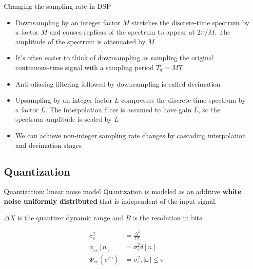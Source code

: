 \documentclass[10pt, aspectratio=169]{beamer}
\begin{document}
%
\begin{frame}{Changing the sampling rate in DSP}
\begin{itemize}
	\item Downsampling by an integer factor $M$ stretches the discrete-time spectrum by a factor $M$ and causes replicas of the spectrum to appear at $2\pi/M$. The amplitude of the spectrum is attenuated by $M$
	\item It's often easier to think of downsampling as sampling the original continuous-time signal with a sampling period $T_d = MT$
	\item Anti-aliasing filtering followed by downsampling is called decimation
	\item Upsampling by an integer factor $L$ compresses the discrete-time spectrum by a factor $L$. The interpolation filter is assumed to have gain $L$, so the spectrum amplitude is scaled by $L$
	\item We can achieve non-integer sampling rate changes by cascading interpolation and decimation stages
\end{itemize}
\end{frame}

%
\subsection{Quantization}
\begin{frame}{Quantization: linear noise model}
Quantization is modeled as an additive \textbf{white noise uniformly distributed} that is independent of the input signal. 

\begin{center}
	\resizebox{0.5\textwidth}{!}{}
\end{center}
\vspace{-0.3cm}

$\Delta X$ is the quantizer dynamic range and $B$ is the resolution in bits.

\begin{align*}
\sigma_e^2 &= \frac{\Delta^2}{12} \tag{average power} \\
\phi_{ee}[n] &= \sigma_e^2\delta[n] \tag{autocorrelation function} \\
\Phi_{ee}(e^{j\omega}) &= \sigma_e^2, |\omega| \leq \pi \tag{PSD}
\end{align*}
\end{frame}
\end{document}
